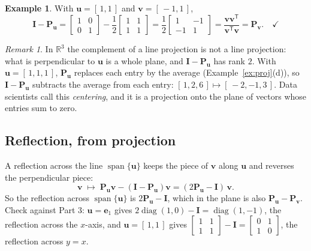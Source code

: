 \documentclass[11pt]{article}
\theoremstyle{plain}
\theoremstyle{definition}
\newtheorem{ex}{Example}[section]
\theoremstyle{remark}
\newtheorem*{rmk}{Remark}
\newcommand{\R}{\mathbb{R}}
\newcommand{\vc}[1]{\mathbf{#1}}
\newcommand{\mt}[1]{\mathbf{#1}}
\newcommand{\T}{^{\mathsf{T}}}
\DeclareMathOperator{\spanop}{span}
\DeclareMathOperator{\diagop}{diag}
\begin{document}
\begin{ex}
With $\vc{u}=[\,1,1\,]$ and $\vc{v}=[\,-1,1\,]$,
\[
  \mt{I}-\mt{P}_{\vc{u}}
  =\begin{bmatrix}1&0\\0&1\end{bmatrix}-\frac12\begin{bmatrix}1&1\\1&1\end{bmatrix}
  =\frac12\begin{bmatrix}1&-1\\-1&1\end{bmatrix}
  =\frac{\vc{v}\vc{v}\T}{\vc{v}\T\vc{v}}
  =\mt{P}_{\vc{v}} . \quad\checkmark
\]
\end{ex}

\begin{rmk}
In $\R^{3}$ the complement of a line projection is not a line projection: what
is perpendicular to $\vc{u}$ is a whole plane, and $\mt{I}-\mt{P}_{\vc{u}}$ has
rank $2$. With $\vc{u}=[\,1,1,1\,]$, $\mt{P}_{\vc{u}}$ replaces each entry by the
average (Example~\ref{ex:proj}(d)), so $\mt{I}-\mt{P}_{\vc{u}}$ subtracts the
average from each entry: $[\,1,2,6\,]\mapsto[\,-2,-1,3\,]$. Data scientists call
this \emph{centering}, and it is a projection onto the plane of vectors whose
entries sum to zero.
\end{rmk}

\subsection{Reflection, from projection}
A reflection across the line $\spanop\{\vc{u}\}$ keeps the piece of $\vc{v}$
along $\vc{u}$ and reverses the perpendicular piece:
\[
  \vc{v}\;\longmapsto\;\mt{P}_{\vc{u}}\vc{v}-(\mt{I}-\mt{P}_{\vc{u}})\vc{v}
  =(2\mt{P}_{\vc{u}}-\mt{I})\,\vc{v} .
\]
So the reflection across $\spanop\{\vc{u}\}$ is $2\mt{P}_{\vc{u}}-\mt{I}$, which
in the plane is also $\mt{P}_{\vc{u}}-\mt{P}_{\vc{v}}$. Check against Part 3:
$\vc{u}=\vc{e}_1$ gives $2\diagop(1,0)-\mt{I}=\diagop(1,-1)$, the reflection
across the $x$-axis, and $\vc{u}=[\,1,1\,]$ gives
$\begin{bmatrix}1&1\\1&1\end{bmatrix}-\mt{I}=\begin{bmatrix}0&1\\1&0\end{bmatrix}$,
the reflection across $y=x$.
\end{document}
